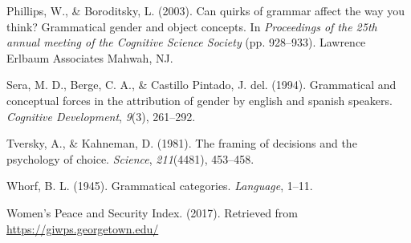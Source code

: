 \documentclass[10pt, letterpaper]{article}
\begin{document}
\hypertarget{ref-phillips2003can}{}
Phillips, W., \& Boroditsky, L. (2003). Can quirks of grammar affect the
way you think? Grammatical gender and object concepts. In
\emph{Proceedings of the 25th annual meeting of the Cognitive Science
Society} (pp. 928--933). Lawrence Erlbaum Associates Mahwah, NJ.

\hypertarget{ref-sera1994grammatical}{}
Sera, M. D., Berge, C. A., \& Castillo Pintado, J. del. (1994).
Grammatical and conceptual forces in the attribution of gender by
english and spanish speakers. \emph{Cognitive Development}, \emph{9}(3),
261--292.

\hypertarget{ref-tversky1981framing}{}
Tversky, A., \& Kahneman, D. (1981). The framing of decisions and the
psychology of choice. \emph{Science}, \emph{211}(4481), 453--458.

\hypertarget{ref-whorf1945grammatical}{}
Whorf, B. L. (1945). Grammatical categories. \emph{Language}, 1--11.

\hypertarget{ref-wps}{}
Women's Peace and Security Index. (2017). Retrieved from
\url{https://giwps.georgetown.edu/}
\end{document}
